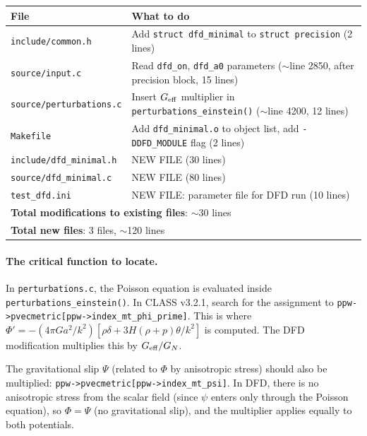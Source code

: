 \documentclass[11pt]{article}
\theoremstyle{definition}
\theoremstyle{remark}
\newcommand{\Geff}{G_{\rm eff}}
\begin{document}
\begin{center}
\begin{tabular}{lp{8cm}}
\toprule
\textbf{File} & \textbf{What to do} \\
\midrule
\texttt{include/common.h} & Add \texttt{struct dfd\_minimal} to
  \texttt{struct precision} (2 lines) \\
\texttt{source/input.c} & Read \texttt{dfd\_on}, \texttt{dfd\_a0}
  parameters ($\sim$line 2850, after precision block, 15 lines) \\
\texttt{source/perturbations.c} & Insert $\Geff$ multiplier in
  \texttt{perturbations\_einstein()} ($\sim$line 4200, 12 lines) \\
\texttt{Makefile} & Add \texttt{dfd\_minimal.o} to object list,
  add \texttt{-DDFD\_MODULE} flag (2 lines) \\
\texttt{include/dfd\_minimal.h} & NEW FILE (30 lines) \\
\texttt{source/dfd\_minimal.c} & NEW FILE (80 lines) \\
\texttt{test\_dfd.ini} & NEW FILE: parameter file for DFD run (10 lines) \\
\midrule
\multicolumn{2}{l}{\textbf{Total modifications to existing files}: $\sim$30 lines} \\
\multicolumn{2}{l}{\textbf{Total new files}: 3 files, $\sim$120 lines} \\
\bottomrule
\end{tabular}
\end{center}

\paragraph{The critical function to locate.}
In \texttt{perturbations.c}, the Poisson equation is evaluated
inside \texttt{perturbations\_einstein()}. In CLASS v3.2.1, search
for the assignment to \texttt{ppw->pvecmetric[ppw->index\_mt\_phi\_prime]}.
This is where $\Phi' = -(4\pi G a^2/k^2)[\rho\delta + 3H(\rho+p)\theta/k^2]$
is computed. The DFD modification multiplies this by $\Geff/G_N$.

The gravitational slip $\Psi$ (related to $\Phi$ by anisotropic stress)
should also be multiplied: \texttt{ppw->pvecmetric[ppw->index\_mt\_psi]}.
In DFD, there is no anisotropic stress from the scalar field
(since $\psi$ enters only through the Poisson equation), so
$\Phi = \Psi$ (no gravitational slip), and the multiplier applies
equally to both potentials.

\end{document}
